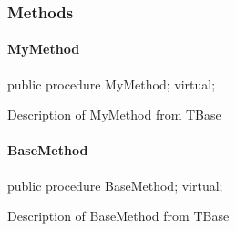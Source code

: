 \documentclass{report}
\newif\ifpdf
\begin{document}
\subsubsection*{\large{\textbf{Methods}}\normalsize\hspace{1ex}\hfill}
\paragraph*{MyMethod}\hspace*{\fill}

\label{ok_inherited_members_hide_ancestor.TBase-MyMethod}
\begin{list}{}{
\setlength{\itemindent}{0cm}
\setlength{\listparindent}{0cm}
\setlength{\leftmargin}{\evensidemargin}
\addtolength{\leftmargin}{\tmplength}
\settowidth{\labelsep}{X}
\addtolength{\leftmargin}{\labelsep}
\setlength{\labelwidth}{\tmplength}
}
\item[\textbf{Declaration}\hfill]
\ifpdf
\begin{flushleft}
\fi
\begin{ttfamily}
public procedure MyMethod; virtual;\end{ttfamily}

\ifpdf
\end{flushleft}
\fi

\par
\item[\textbf{Description}]
Description of MyMethod from TBase

\end{list}
\paragraph*{BaseMethod}\hspace*{\fill}

\label{ok_inherited_members_hide_ancestor.TBase-BaseMethod}
\begin{list}{}{
\setlength{\itemindent}{0cm}
\setlength{\listparindent}{0cm}
\setlength{\leftmargin}{\evensidemargin}
\addtolength{\leftmargin}{\tmplength}
\settowidth{\labelsep}{X}
\addtolength{\leftmargin}{\labelsep}
\setlength{\labelwidth}{\tmplength}
}
\item[\textbf{Declaration}\hfill]
\ifpdf
\begin{flushleft}
\fi
\begin{ttfamily}
public procedure BaseMethod; virtual;\end{ttfamily}

\ifpdf
\end{flushleft}
\fi

\par
\item[\textbf{Description}]
Description of BaseMethod from TBase

\end{list}
\end{document}
